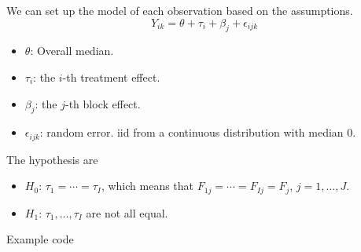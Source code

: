 We can set up the model of each observation based on the assumptions.
\[Y_{ik} = \theta + \tau_i + \beta_j + \epsilon_{ijk}\]
\begin{itemize}
	\item $\theta$: Overall median.
	\item $\tau_i$: the $i$-th treatment effect.
	\item $\beta_j$: the $j$-th block effect.
	\item $\epsilon_{ijk}$: random error. iid from a continuous distribution with median 0.
\end{itemize}
The hypothesis are
\begin{itemize}
	\item $H_0$: $\tau_1 = \cdots = \tau_I$, which means that $F_{1j} = \cdots = F_{Ij} = F_j$, $j = 1, \dots, J$.
	\item $H_1$: $\tau_1, \dots, \tau_I$ are not all equal.
\end{itemize}

Example code
